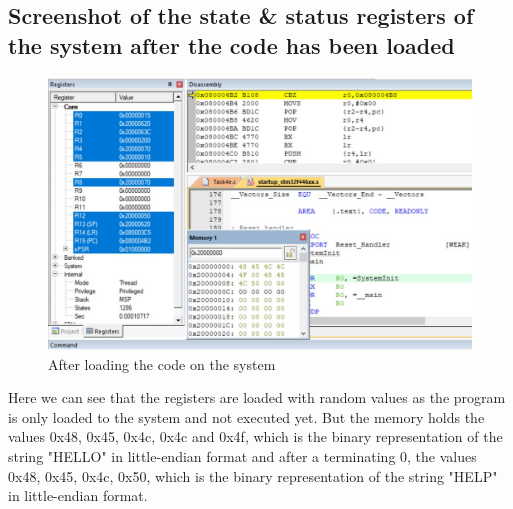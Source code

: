 \documentclass[footheight=20pt, footsepline, headheight=20pt, headsepline]{scrartcl}
\begin{document}
\FloatBarrier
\subsection*{Screenshot of the state \& status registers of the system after the code has been loaded}
\begin{figure}[ht]
    \centering
    \includegraphics[scale=.7]{images/Task4e_Before1.jpg}
    \caption{After loading the code on the system}
    \label{fig:before_task_4e}
\end{figure}
\FloatBarrier
Here we can see that the registers are loaded with random values as the program is only loaded to the system and not executed yet. But the memory holds the values 0x48, 0x45, 0x4c, 0x4c and 0x4f, which is the binary representation of the string "HELLO" in little-endian format and after a terminating 0, the values 0x48, 0x45, 0x4c, 0x50, which is the binary representation of the string "HELP" in little-endian format.
\end{document}
